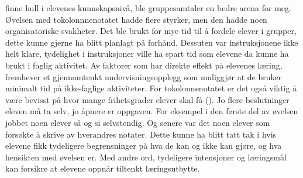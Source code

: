 \documentclass[main.tex]{subfiles}
\begin{document}
finne hull i elevenes kunnskapsnivå, ble gruppesamtaler en bedre arena for meg.
\newline
\newline
Øvelsen med tokolonnnenotatet hadde flere styrker, men den hadde noen organisatoriske svakheter. 
Det ble brukt for mye tid til å fordele elever i grupper, dette kunne gjerne ha blitt planlagt på 
forhånd. Dessuten var instruksjonene ikke helt klare, tydelighet i instruksjoner ville ha spart tid 
som elevene da kunne ha brukt i faglig aktivitet. Av faktorer som har direkte effekt på elevenes 
læring, fremhever  et gjennomtenkt undervisningsopplegg som muliggjør at 
de bruker minimalt tid på ikke-faglige aktiviteter. For tokolonnenotatet er det også viktig å være 
bevisst på hvor mange frihetsgrader elever skal få (). Jo flere beslutninger eleven 
må ta selv, jo åpnere er oppgaven. For eksempel i den første del av øvelsen jobbet noen elever 
så og si selvstendig. Og senere var det noen elever som forsøkte å skrive av hverandres notater.
Dette kunne ha blitt tatt tak i hvis elevene fikk tydeligere begrensninger på hva de kan og ikke
kan gjøre, og hva hensikten med øvelsen er. Med andre ord, tydeligere intensjoner og læringsmål
kan forsikre at elevene oppnår tiltenkt læringsutbytte. 
\end{document}
